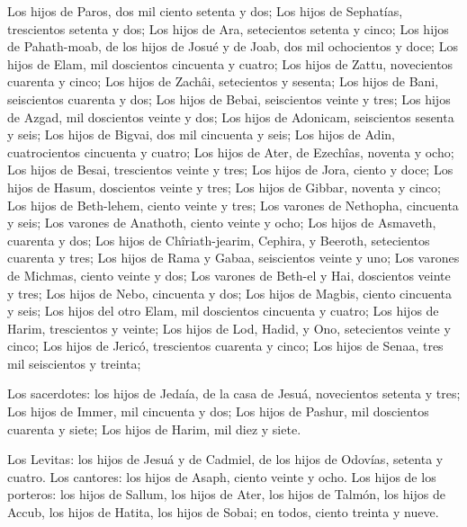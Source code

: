  Los hijos de Paros, dos mil ciento setenta y dos;
 Los hijos de Sephatías, trescientos setenta y dos;
 Los hijos de Ara, setecientos setenta y cinco; 
Los hijos de Pahath-moab, de los hijos de Josué y de Joab, dos mil
ochocientos y doce;  Los hijos de Elam, mil doscientos
cincuenta y cuatro;  Los hijos de Zattu, novecientos
cuarenta y cinco;  Los hijos de Zachâi, setecientos y
sesenta;  Los hijos de Bani, seiscientos cuarenta y dos;
 Los hijos de Bebai, seiscientos veinte y tres;
 Los hijos de Azgad, mil doscientos veinte y dos;
 Los hijos de Adonicam, seiscientos sesenta y seis;
 Los hijos de Bigvai, dos mil cincuenta y seis;
 Los hijos de Adin, cuatrocientos cincuenta y cuatro;
 Los hijos de Ater, de Ezechîas, noventa y ocho;
 Los hijos de Besai, trescientos veinte y tres;
 Los hijos de Jora, ciento y doce;  Los hijos
de Hasum, doscientos veinte y tres;  Los hijos de Gibbar,
noventa y cinco;  Los hijos de Beth-lehem, ciento veinte y
tres;  Los varones de Nethopha, cincuenta y seis;
 Los varones de Anathoth, ciento veinte y ocho;
 Los hijos de Asmaveth, cuarenta y dos;  Los
hijos de Chîriath-jearim, Cephira, y Beeroth, setecientos cuarenta y
tres;  Los hijos de Rama y Gabaa, seiscientos veinte y uno;
 Los varones de Michmas, ciento veinte y dos; 
Los varones de Beth-el y Hai, doscientos veinte y tres; 
Los hijos de Nebo, cincuenta y dos;  Los hijos de Magbis,
ciento cincuenta y seis;  Los hijos del otro Elam, mil
doscientos cincuenta y cuatro;  Los hijos de Harim,
trescientos y veinte;  Los hijos de Lod, Hadid, y Ono,
setecientos veinte y cinco;  Los hijos de Jericó,
trescientos cuarenta y cinco;  Los hijos de Senaa, tres mil
seiscientos y treinta;

 Los sacerdotes: los hijos de Jedaía, de la casa de Jesuá,
novecientos setenta y tres;  Los hijos de Immer, mil
cincuenta y dos;  Los hijos de Pashur, mil doscientos
cuarenta y siete;  Los hijos de Harim, mil diez y siete.

 Los Levitas: los hijos de Jesuá y de Cadmiel, de los hijos
de Odovías, setenta y cuatro.  Los cantores: los hijos de
Asaph, ciento veinte y ocho.  Los hijos de los porteros:
los hijos de Sallum, los hijos de Ater, los hijos de Talmón, los hijos
de Accub, los hijos de Hatita, los hijos de Sobai; en todos, ciento
treinta y nueve.

